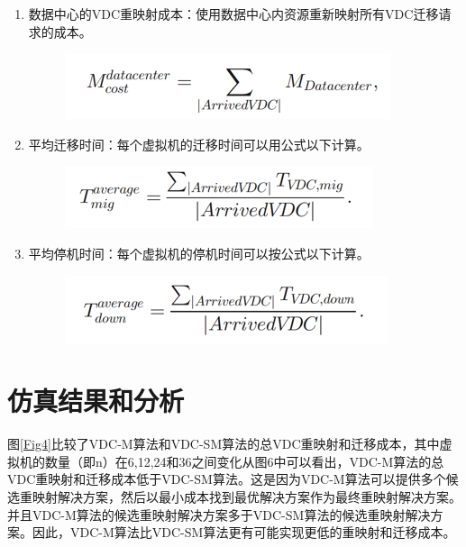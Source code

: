 \begin{enumerate}
    \item 数据中心的VDC重映射成本：使用数据中心内资源重新映射所有VDC迁移请求的成本。

    \begin{figure}[!htb]
    \centering
    \includegraphics{./Figure/express19.png}
  \end{figure}

    \item 平均迁移时间：每个虚拟机的迁移时间可以用公式以下计算。

    \begin{figure}[!htb]
    \centering
    \includegraphics{./Figure/express20.png}
  \end{figure}

    \item 平均停机时间：每个虚拟机的停机时间可以按公式以下计算。

    \begin{figure}[!htb]
    \centering
    \includegraphics{./Figure/express21.png}
  \end{figure}

\end{enumerate}

\section{仿真结果和分析}
图\ref{Fig4}比较了VDC-M算法和VDC-SM算法的总VDC重映射和迁移成本，其中虚拟机的数量（即n）在6,12,24和36之间变化从图6中可以看出，VDC-M算法的总VDC重映射和迁移成本低于VDC-SM算法。这是因为VDC-M算法可以提供多个候选重映射解决方案，然后以最小成本找到最优解决方案作为最终重映射解决方案。并且VDC-M算法的候选重映射解决方案多于VDC-SM算法的候选重映射解决方案。因此，VDC-M算法比VDC-SM算法更有可能实现更低的重映射和迁移成本。

